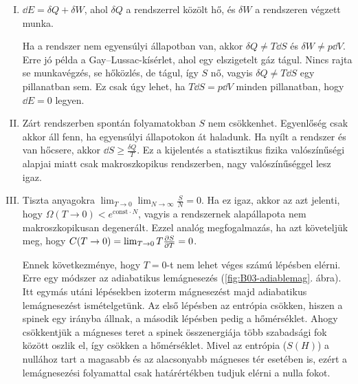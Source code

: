    \begin{enumerate}[I. főtétel:]
    \item 
     $\dd E=\delta Q+\delta W$, ahol $\delta Q$ a rendszerrel közölt hő, és $\delta W$ a rendszeren végzett munka.
    
     Ha a rendszer nem egyensúlyi állapotban van, akkor $\delta Q\ne T\dd S$ és $\delta W\ne p\dd V$. Erre jó példa a Gay--Lussac-kísérlet, ahol egy elszigetelt gáz tágul. Nincs rajta se munkavégzés, se hőközlés, de tágul, így $S$ nő, vagyis $\delta Q\ne T\dd S$ egy pillanatban sem. Ez csak úgy lehet, ha $T\dd S=p\dd V$ minden pillanatban, hogy $\dd E=0$ legyen.
    
    \item
     Zárt rendszerben spontán folyamatokban $S$ nem csökkenhet. Egyenlőség csak akkor áll fenn, ha egyensúlyi állapotokon át haladunk. Ha nyílt a rendszer és van hőcsere, akkor $\dd S\ge\frac{\delta Q}{T}$. Ez a kijelentés a statisztikus fizika valószínűségi alapjai miatt csak makroszkopikus rendszerben, nagy valószínűséggel lesz igaz.
     
    \item 
     Tiszta anyagokra $\lim_{T\to 0}\lim_{N\to\infty}\frac{S}{N}=0$. Ha ez igaz, akkor az azt jelenti, hogy $\Omega(T\to 0)<e^{\text{const} \cdot N}$, vagyis a rendszernek alapállapota nem makroszkopikusan degenerált. Ezzel analóg megfogalmazás, ha azt követeljük meg, hogy $C(T\to 0)=\lim_{T\to 0}T\frac{\partial S}{\partial T}=0$.
     
     Ennek következménye, hogy $T=0$-t nem lehet véges számú lépésben elérni. Erre egy módszer az adiabatikus lemágnesezés (\ref{fig:B03-adiablemag}. ábra). Itt egymás utáni lépésekben izoterm mágnesezést majd adiabatikus lemágnesezést ismételgetünk. Az első lépésben az entrópia csökken, hiszen a spinek egy irányba állnak, a második lépésben pedig a hőmérséklet. Ahogy csökkentjük a mágneses teret a spinek összenergiája több szabadsági fok között oszlik el, így csökken a hőmérséklet. Mivel az entrópia ($S(H)$) a nullához tart a magasabb és az alacsonyabb mágneses tér esetében is, ezért a lemágnesezési folyamattal csak határértékben tudjuk elérni a nulla fokot. 
     

\end{enumerate}
